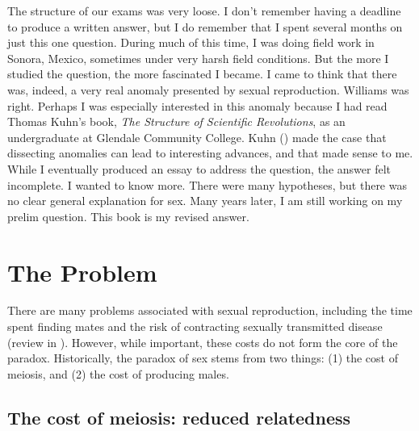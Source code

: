 \documentclass[
  american,
  letterpaper,
]{book}
\begin{document}
The structure of our exams was very loose. I don't remember having a
deadline to produce a written answer, but I do remember that I spent
several months on just this one question. During much of this time, I
was doing field work in Sonora, Mexico, sometimes under very harsh field
conditions. But the more I studied the question, the more fascinated I
became. I came to think that there was, indeed, a very real anomaly
presented by sexual reproduction. Williams was right. Perhaps I was
especially interested in this anomaly because I had read Thomas Kuhn's
book, \emph{The Structure of Scientific Revolutions}, as an
undergraduate at Glendale Community College. Kuhn
() made the case that dissecting anomalies
can lead to interesting advances, and that made sense to me. While I
eventually produced an essay to address the question, the answer felt
incomplete. I wanted to know more. There were many hypotheses, but there
was no clear general explanation for sex. Many years later, I am still
working on my prelim question. This book is my revised answer.

\section{The Problem}\label{the-problem}

There are many problems associated with sexual reproduction, including
the time spent finding mates and the risk of contracting sexually
transmitted disease (review in ). However, while important, these costs do not form
the core of the paradox. Historically, the paradox of sex stems from two
things: (1) the cost of meiosis, and (2) the cost of producing males.

\subsection{The cost of meiosis: reduced
relatedness}\label{the-cost-of-meiosis-reduced-relatedness}
\end{document}
